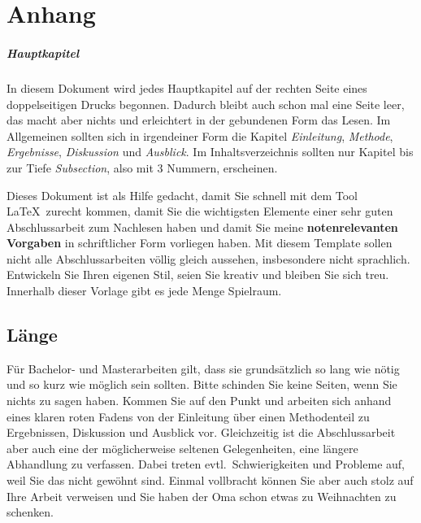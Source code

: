 
\appendix


\chapter{Anhang}
\label{anhang}

\paragraph{Hauptkapitel}
In diesem Dokument wird jedes Hauptkapitel auf der rechten Seite eines doppelseitigen Drucks begonnen.
Dadurch bleibt auch schon mal eine Seite leer, das macht aber nichts und erleichtert in der gebundenen Form das Lesen.
Im Allgemeinen sollten sich in irgendeiner Form die Kapitel \emph{ Einleitung}, \emph{Methode}, \emph{Ergebnisse}, \emph{Diskussion} und \emph{ Ausblick}.
Im Inhaltsverzeichnis sollten nur Kapitel bis zur Tiefe \emph{ Subsection}, also mit 3 Nummern, erscheinen.

Dieses Dokument ist als Hilfe gedacht, damit Sie schnell mit dem Tool \LaTeX~zurecht kommen,
damit Sie die wichtigsten Elemente einer sehr guten Abschlussarbeit zum Nachlesen haben und damit Sie meine \textbf{notenrelevanten Vorgaben} in schriftlicher Form vorliegen haben.
Mit diesem Template sollen nicht alle Abschlussarbeiten völlig gleich aussehen, insbesondere nicht sprachlich.
Entwickeln Sie Ihren eigenen Stil, seien Sie kreativ und bleiben Sie sich treu. Innerhalb dieser Vorlage gibt es jede Menge Spielraum.


\section{Länge}
\label{laenge}

Für Bachelor- und Masterarbeiten gilt, dass sie grundsätzlich so lang wie nötig und so kurz wie möglich sein sollten.
Bitte schinden Sie keine Seiten, wenn Sie nichts zu sagen haben.
Kommen Sie auf den Punkt und arbeiten sich anhand eines klaren roten Fadens von der Einleitung über einen Methodenteil zu Ergebnissen, Diskussion und Ausblick vor.
Gleichzeitig ist die Abschlussarbeit aber auch eine der möglicherweise seltenen Gelegenheiten, eine längere Abhandlung zu verfassen.
Dabei treten evtl.~Schwierigkeiten und Probleme auf, weil Sie das nicht gewöhnt sind.
Einmal vollbracht können Sie aber auch stolz auf Ihre Arbeit verweisen und Sie haben der Oma schon etwas zu Weihnachten zu schenken.

